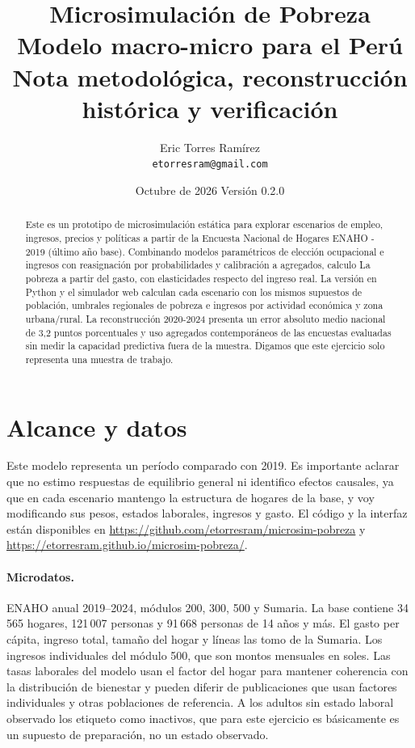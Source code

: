 \documentclass[11pt,a4paper]{article}
\title{\textbf{Microsimulación de Pobreza}\\\large Modelo macro-micro para el Perú\\\normalsize Nota metodológica, reconstrucción histórica y verificación}
\author{Eric Torres Ramírez\\\small\texttt{etorresram@gmail.com}}
\date{Octubre de 2026 \textbullet{} Versión 0.2.0}
\begin{document}
\maketitle
\begin{abstract}
\noindent Este es un prototipo de microsimulación estática para explorar escenarios de empleo, ingresos, precios y políticas a partir de la Encuesta Nacional de Hogares ENAHO - 2019 (último año base). Combinando modelos paramétricos de elección ocupacional e ingresos con reasignación por probabilidades y calibración a agregados, calculo La pobreza a partir del gasto, con elasticidades respecto del ingreso real. La versión en Python y el simulador web calculan cada escenario con los mismos supuestos de población, umbrales regionales de pobreza e ingresos por actividad económica y zona urbana/rural. La reconstrucción 2020-2024 presenta un error absoluto medio nacional de 3,2 puntos porcentuales y uso agregados contemporáneos de las encuestas evaluadas sin medir la capacidad predictiva fuera de la muestra. Digamos que este ejercicio solo representa una muestra de trabajo.
\end{abstract}

\section{Alcance y datos}
Este modelo representa un período comparado con 2019. Es importante aclarar que no estimo respuestas de equilibrio general ni identifico efectos causales, ya que en cada escenario mantengo la estructura de hogares de la base, y voy modificando sus pesos, estados laborales, ingresos y gasto. El código y la interfaz están disponibles en \url{https://github.com/etorresram/microsim-pobreza} y \url{https://etorresram.github.io/microsim-pobreza/}.

\paragraph{Microdatos.} ENAHO anual 2019--2024, módulos 200, 300, 500 y Sumaria. La base contiene 34\,565 hogares, 121\,007 personas y 91\,668 personas de 14 años y más. El gasto per cápita, ingreso total, tamaño del hogar y líneas las tomo de la Sumaria. Los ingresos individuales del módulo 500, que son montos mensuales en soles. Las tasas laborales del modelo usan el factor del hogar para mantener coherencia con la distribución de bienestar y pueden diferir de publicaciones que usan factores individuales y otras poblaciones de referencia. A los adultos sin estado laboral observado los etiqueto como inactivos, que para este ejercicio es básicamente es un supuesto de preparación, no un estado observado.
\end{document}
